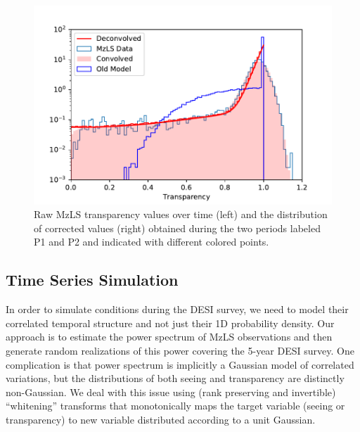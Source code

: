 \documentclass[12pt]{article}
\begin{document}
\begin{figure}[htb]
\begin{center}
\includegraphics[width=5in]{transp-model}
\caption{Raw MzLS transparency values over time (left) and the distribution of corrected values (right) obtained during the two periods labeled P1 and P2 and indicated with different colored points.}
\label{fig:transp-model}
\end{center}
\end{figure}

\subsection{Time Series Simulation}

In order to simulate conditions during the DESI survey, we need to model their correlated temporal structure and not just their 1D probability density.  Our approach is to estimate the power spectrum of MzLS observations and then generate random realizations of this power covering the 5-year DESI survey.  One complication is that power spectrum is implicitly a Gaussian model of correlated variations, but the distributions of both seeing and transparency are distinctly non-Gaussian.  We deal with this issue using (rank preserving and invertible) ``whitening'' transforms that monotonically maps the target variable (seeing or transparency) to new variable distributed according to a unit Gaussian.
\end{document}
